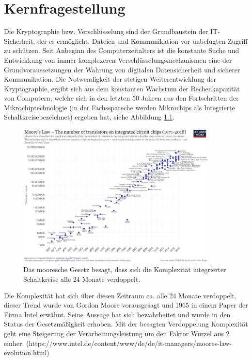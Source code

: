\chapter{Kernfragestellung}

Die Kryptographie bzw. Verschlüsselung sind der Grundbaustein der IT-Sicherheit, der es ermöglicht, Dateien und Kommunikation vor unbefugten Zugriff zu schützen.
Seit Anbeginn des Computerzeitalters ist die konstante Suche und Entwickkung von immer komplexeren Verschlüsselungsmechanismen eine der Grundvoraussetzungen der Wahrung von digitalen Datensicherheit und sicherer Kommunikation. Die Notwendigkeit der stetigen Weiterentwicklung der Kryptographie, ergibt sich aus dem konstanten Wachstum der Rechenkapazität von Computern, welche sich in den letzten 50 Jahren aus den Fortschritten der Mikrochiptechnologie (in der Fachsspareche werden Mikrochips als Integrierte Schaltkreisebezeichnet) ergeben hat, siehe Abbildung \ref{fig:Bild0}.
\begin{figure}[htbp] 
  \centering
     \includegraphics[width=0.9\textwidth]{img/Moores.png}
     \caption{Das mooresche Gesetz besagt, dass sich die Komplexität integrierter Schaltkreise alle 24 Monate verdoppelt.}
  \label{fig:Bild0}
\end{figure}
Die Komplexität hat sich über diesen Zeitraum ca. alle 24 Monate verdoppelt, dieser Trend wurde von Gordon Moore vorausgesagt und 1965 in einem Paper der Firma Intel erwähnt. Seine Aussage hat sich bewahrheitet und wurde in den Status der Gesetzmäßigkeit erhoben.
Mit der besagten Verdoppelung Komplexität geht eine Steigerung der Verarbeitungsleistung um den Faktor Wurzel aus 2 einher. (https://www.intel.de/content/www/de/de/it-managers/moores-law-evolution.html)


